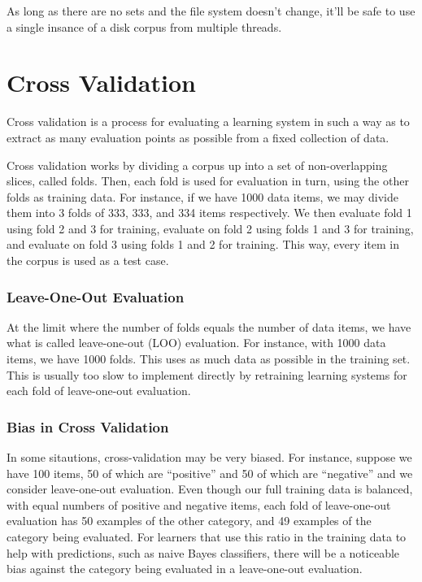 As long as there are no sets and the file system doesn't change,
it'll be safe to use a single insance of a disk corpus from
multiple threads.


\section{Cross Validation}\label{section:corpus-xval}

Cross validation is a process for evaluating a learning system in such
a way as to extract as many evaluation points as possible from a fixed
collection of data.

Cross validation works by dividing a corpus up into a set of
non-overlapping slices, called folds.  Then, each fold is used for
evaluation in turn, using the other folds as training data.  For
instance, if we have 1000 data items, we may divide them into 3 folds
of 333, 333, and 334 items respectively.  We then evaluate fold 1
using fold 2 and 3 for training, evaluate on fold 2 using folds 1 and
3 for training, and evaluate on fold 3 using folds 1 and 2 for
training.  This way, every item in the corpus is used as a test case.

\subsubsection{Leave-One-Out Evaluation}

At the limit where the number of folds equals the number of data
items, we have what is called leave-one-out (LOO) evaluation.  For
instance, with 1000 data items, we have 1000 folds.  This uses as much
data as possible in the training set.  This is usually too slow to
implement directly by retraining learning systems for each fold of
leave-one-out evaluation.


\subsubsection{Bias in Cross Validation}

In some sitautions, cross-validation may be very biased.  For
instance, suppose we have 100 items, 50 of which are ``positive'' and
50 of which are ``negative'' and we consider leave-one-out evaluation.
Even though our full training data is balanced, with equal numbers of
positive and negative items, each fold of leave-one-out evaluation has
50 examples of the other category, and 49 examples of the category
being evaluated.  For learners that use this ratio in the training
data to help with predictions, such as naive Bayes classifiers, there
will be a noticeable bias against the category being evaluated in a
leave-one-out evaluation.

